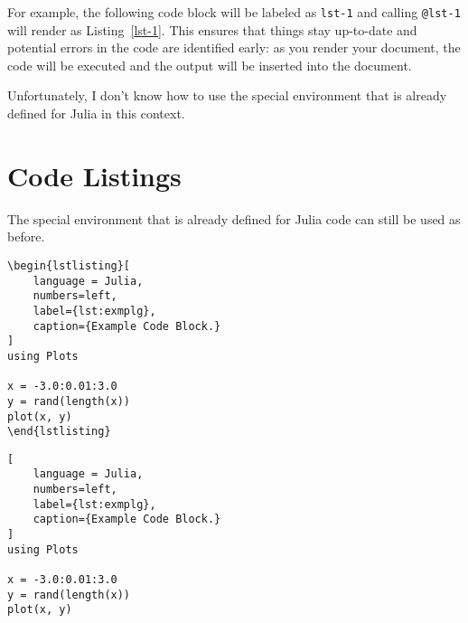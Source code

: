 \documentclass{juliacon}
\begin{document}
For example, the following code block will be labeled as \texttt{lst-1}
and calling \texttt{@lst-1} will render as Listing~\ref{lst-1}. This
ensures that things stay up-to-date and potential errors in the code are
identified early: as you render your document, the code will be executed
and the output will be inserted into the document.

\begin{codelisting}

\caption{\label{lst-1}A listing caption}


\end{codelisting}%

Unfortunately, I don't know how to use the special environment that is
already defined for Julia in this context.

\section{Code Listings}\label{code-listings}

The special environment that is already defined for Julia code can still
be used as before.

\begin{verbatim}
\begin{lstlisting}[
    language = Julia, 
    numbers=left, 
    label={lst:exmplg}, 
    caption={Example Code Block.}
]
using Plots

x = -3.0:0.01:3.0
y = rand(length(x))
plot(x, y)
\end{lstlisting}
\end{verbatim}
\begin{lstlisting}[
    language = Julia, 
    numbers=left, 
    label={lst:exmplg}, 
    caption={Example Code Block.}
]
using Plots

x = -3.0:0.01:3.0
y = rand(length(x))
plot(x, y)
\end{lstlisting}
\end{document}
